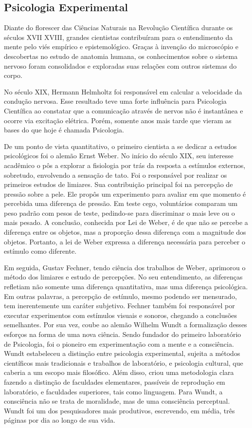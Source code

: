 \subsection{Psicologia Experimental}

Diante do florescer das Ciências Naturais na Revolução Científica durante os séculos XVII  XVIII, grandes cientistas contribuíram para o entendimento da mente pelo viés empírico e epistemológico. Graças à invenção do microscópio e descobertas no estudo de anatomia humana, os conhecimentos sobre o sistema nervoso foram consolidados e exploradas suas relações com outros sistemas do corpo. 

No século XIX, Hermann Helmholtz foi responsável em calcular a velocidade da condução nervosa. Esse resultado teve uma forte influência para Psicologia Científica ao constatar que a comunicação através de nervos não é instantânea e ocorre via excitação elétrica. Porém, somente anos mais tarde que vieram as bases do que hoje é chamada Psicologia.

De um ponto de vista quantitativo, o primeiro cientista a se dedicar a estudos psicológicos foi o alemão Ernst Weber. No início do século XIX, seu interesse acadêmico o pôs a explorar a fisiologia por trás da resposta a estímulos externos, sobretudo, envolvendo a sensação de tato. Foi o responsável por realizar os primeiros estudos de limiares. Sua contribuição principal foi na percepção de pressão sobre a pele. Ele propôs um experimento para avaliar em que momento é percebida uma diferença de pressão. Em teste cego, voluntários comparam um peso padrão com pesos de teste, pedindo-se para discriminar o mais leve ou o mais pesado.  A conclusão, conhecida por Lei de Weber, é de que não se percebe a diferença entre os objetos, mas a proporção dessa diferença com a magnitude dos objetos. Portanto, a lei de Weber expressa a diferença necessária para perceber o estímulo como diferente. 

Em seguida, Gustav Fechner, tendo ciência dos trabalhos de Weber, aprimorou o método dos limiares e estudo de percepções. No seu entendimento, as diferenças refletiam não somente uma diferença quantitativa, mas uma diferença psicológica. Em outras palavras, a percepção de estímulo, mesmo podendo ser mensurado, tem inerentemente um caráter subjetivo. Fechner também foi responsável por executar experimentos com estímulos visuais e sonoros, chegando a conclusões semelhantes.
Por sua vez, coube ao alemão Wilhelm Wundt a formalização desses esforços na forma de uma nova ciência. Sendo fundador do primeiro laboratório de Psicologia, foi o pioneiro em experimentação com a mente e a consciência. Wundt estabeleceu a distinção entre psicologia experimental, sujeita a métodos científicos mais tradicionais e trabalhos de laboratório, e psicologia cultural, que caberia a um escopo mais filosófico. Além disso, criou uma metodologia clara fazendo a distinção de faculdades elementares, passíveis de reprodução em laboratório, e faculdades superiores, tais como linguagem. Para Wundt, a consciência não se trata de moralidade, mas de uma consciência perceptual. Wundt foi um dos pesquisadores mais produtivos, escrevendo, em média, três páginas por dia ao longo de sua vida.

